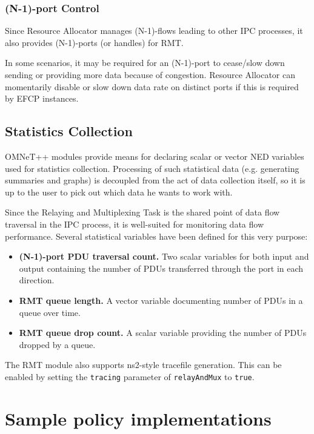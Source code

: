             \subsubsection{(N-1)-port Control}

                Since Resource Allocator manages (N-1)-flows leading to other IPC processes, it also provides (N-1)-ports (or handles) for RMT.

                In some scenarios, it may be required for an (N-1)-port to cease/slow down sending or providing more data because of congestion. Resource Allocator can momentarily disable or slow down data rate on distinct ports if this is required by EFCP instances.


        \subsection{Statistics Collection}

            OMNeT++ modules provide means for declaring scalar or vector NED variables used for statistics collection. Processing of such statistical data (e.g. generating summaries and graphs) is decoupled from the act of data collection itself, so it is up to the user to pick out which data he wants to work with.

            Since the Relaying and Multiplexing Task is the shared point of data flow traversal in the IPC process, it is well-suited for monitoring data flow performance. Several statistical variables have been defined for this very purpose:

            \begin{itemize}
                \item \textbf{(N-1)-port PDU traversal count.} Two scalar variables for both input and output containing the number of PDUs transferred through the port in each direction.
                \item \textbf{RMT queue length.} A vector variable documenting number of PDUs in a queue over time.
                \item \textbf{RMT queue drop count.} A scalar variable providing the number of PDUs dropped by a queue.
            \end{itemize}

            The RMT module also supports ns2-style tracefile generation. This can be enabled by setting the \texttt{tracing} parameter of \texttt{relayAndMux} to \texttt{true}.

    \section{Sample policy implementations}\label{implementation:policies}

